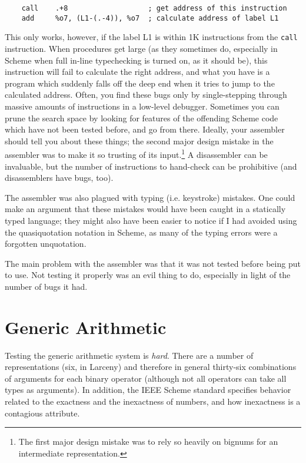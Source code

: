 \begin{verbatim}
    call    .+8                   ; get address of this instruction
    add     %o7, (L1-(.-4)), %o7  ; calculate address of label L1
\end{verbatim}

This only works, however, if the label L1 is within 1K instructions from the
{\tt call} instruction. When procedures get large (as they sometimes do,
especially in Scheme when full in-line typechecking is turned on, as it
should be), this instruction will fail to calculate the right address, and
what you have is a program which suddenly falls off the deep end when it
tries to jump to the calculated address. Often, you find these bugs only
by single-stepping through massive amounts of instructions in a low-level
debugger. Sometimes you can prune the search space by looking for features
of the offending Scheme code which have not been tested before, and go from
there. Ideally, your assembler should tell you about these things; the
second major design mistake in the assembler was to make it so trusting of
its input.\footnote{The first major design mistake was to rely so heavily on
bignums for an intermediate representation.} A disassembler can be
invaluable, but the number of instructions to hand-check can be prohibitive
(and disassemblers have bugs, too).

The assembler was also plagued with typing (i.e. keystroke) mistakes. One
could make an argument that these mistakes would have been caught in a
statically typed language; they might also have been easier to notice if I
had avoided using the quasiquotation notation in Scheme, as many of the
typing errors were a forgotten unquotation.

The main problem with the assembler was that it was not tested before being
put to use. Not testing it properly was an evil thing to do, especially in
light of the number of bugs it had.

\section{Generic Arithmetic}

Testing the generic arithmetic system is {\em hard}. There are a number of
representations (six, in Larceny) and therefore in general thirty-six
combinations of arguments for each binary operator (although not all
operators can take all types as arguments). In addition, the IEEE Scheme
standard specifies behavior related to the exactness and the inexactness
of numbers, and how inexactness is a contagious attribute.


